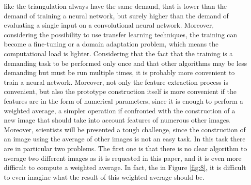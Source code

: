 \documentclass[conference]{IEEEtran}
\begin{document}
			like the triangulation always have the same demand, that is lower than the demand of training a neural network, but surely higher than the demand of evaluating a single input on a convolutional neural network. 
			Moreover, considering the possibility to use transfer learning techniques, the training can become a fine-tuning or a domain adaptation problem, which means the computational load is lighter. Considering that 
			the fact that the training is a demanding task to be performed only once and that other algorithms may be less demanding but must be run multiple times, it is probably more convenient to train a neural 
			network. Moreover, not only the feature extraction process is convenient, but also the prototype construction itself is more convenient if the features are in the form of numerical parameters, since it is 
			enough to perform a weighted average, a simpler operation if confronted with the construction of a new image that should take into account features of numerous other images.
			Moreover, scientists will be presented a tough challenge, since the construction of an image using the average of other images is not an easy task. In this task there are in particular two problems. The first 
			one is that there is no clear algorithm to average two different images as it is requested in this paper, 
			and it is even more difficult to compute a weighted average. In fact, the in Figure \ref{fig:8}, it is difficult to even imagine what the result of this weighted average should be. 
			
\end{document}
